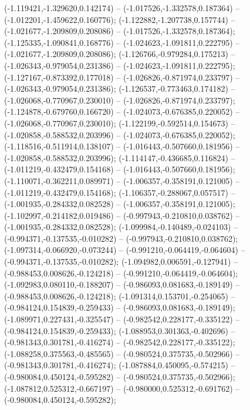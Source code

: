  (-1.119421,-1.329620,0.142174) -- (-1.017526,-1.332578,0.187364) -- (-1.012201,-1.459622,0.160776);
 (-1.122882,-1.207738,0.157744) -- (-1.021677,-1.209809,0.208086) -- (-1.017526,-1.332578,0.187364);
 (-1.125335,-1.090841,0.168776) -- (-1.024623,-1.091811,0.222795) -- (-1.021677,-1.209809,0.208086);
 (-1.126766,-0.979284,0.175213) -- (-1.026343,-0.979054,0.231386) -- (-1.024623,-1.091811,0.222795);
 (-1.127167,-0.873392,0.177018) -- (-1.026826,-0.871974,0.233797) -- (-1.026343,-0.979054,0.231386);
 (-1.126537,-0.773463,0.174182) -- (-1.026068,-0.770967,0.230010) -- (-1.026826,-0.871974,0.233797);
 (-1.124878,-0.679760,0.166720) -- (-1.024073,-0.676385,0.220052) -- (-1.026068,-0.770967,0.230010);
 (-1.122199,-0.592514,0.154673) -- (-1.020858,-0.588532,0.203996) -- (-1.024073,-0.676385,0.220052);
 (-1.118516,-0.511914,0.138107) -- (-1.016443,-0.507660,0.181956) -- (-1.020858,-0.588532,0.203996);
 (-1.114147,-0.436685,0.116824) -- (-1.011219,-0.432479,0.154168) -- (-1.016443,-0.507660,0.181956);
 (-1.110071,-0.362211,0.089971) -- (-1.006357,-0.358191,0.121005) -- (-1.011219,-0.432479,0.154168);
 (-1.106357,-0.288067,0.057517) -- (-1.001935,-0.284332,0.082528) -- (-1.006357,-0.358191,0.121005);
 (-1.102997,-0.214182,0.019486) -- (-0.997943,-0.210810,0.038762) -- (-1.001935,-0.284332,0.082528);
 (-1.099984,-0.140489,-0.024103) -- (-0.994371,-0.137535,-0.010282) -- (-0.997943,-0.210810,0.038762);
 (-1.097314,-0.066920,-0.073244) -- (-0.991210,-0.064419,-0.064604) -- (-0.994371,-0.137535,-0.010282);
 (-1.094982,0.006591,-0.127941) -- (-0.988453,0.008626,-0.124218) -- (-0.991210,-0.064419,-0.064604);
 (-1.092983,0.080110,-0.188207) -- (-0.986093,0.081683,-0.189149) -- (-0.988453,0.008626,-0.124218);
 (-1.091314,0.153701,-0.254065) -- (-0.984124,0.154839,-0.259433) -- (-0.986093,0.081683,-0.189149);
 (-1.089971,0.227431,-0.325547) -- (-0.982542,0.228177,-0.335122) -- (-0.984124,0.154839,-0.259433);
 (-1.088953,0.301363,-0.402696) -- (-0.981343,0.301781,-0.416274) -- (-0.982542,0.228177,-0.335122);
 (-1.088258,0.375563,-0.485565) -- (-0.980524,0.375735,-0.502966) -- (-0.981343,0.301781,-0.416274);
 (-1.087884,0.450095,-0.574215) -- (-0.980084,0.450124,-0.595282) -- (-0.980524,0.375735,-0.502966);
 (-1.087812,0.525312,-0.667197) -- (-0.980000,0.525312,-0.691762) -- (-0.980084,0.450124,-0.595282);
